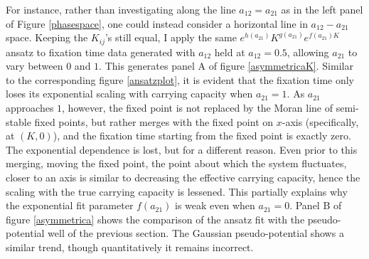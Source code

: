 For instance, rather than investigating along the line $a_{12} = a_{21}$ as in the left panel of Figure \ref{phasespace}, one could instead consider a horizontal line in $a_{12}-a_{21}$ space. 
Keeping the $K_{ij}$'s still equal, I apply the same $e^{h(a_{21})}K^{g(a_{21})}e^{f(a_{21})K}$ ansatz to fixation time data generated with $a_{12}$ held at $a_{12}=0.5$, allowing $a_{21}$ to vary between $0$ and $1$. 
This generates panel A of figure \ref{asymmetricaK}. %
Similar to the corresponding figure \ref{ansatzplot}, it is evident that the fixation time only loses its exponential scaling with carrying capacity when $a_{21}=1$. 
As $a_{21}$ approaches $1$, however, the fixed point is not replaced by the Moran line of semi-stable fixed points, but rather merges with the fixed point on $x$-axis (specifically, at $(K,0)$), and the fixation time starting from the fixed point is exactly zero. 
The exponential dependence is lost, but for a different reason. 
Even prior to this merging, moving the fixed point, the point about which the system fluctuates, closer to an axis is similar to decreasing the effective carrying capacity, hence the scaling with the true carrying capacity is lessened. 
This partially explains why the exponential fit parameter $f(a_{21})$ is weak even when $a_{21}=0$. 
Panel B of figure \ref{asymmetrica} shows the comparison of the ansatz fit with the pseudo-potential well of the previous section. 
The Gaussian pseudo-potential shows a similar trend, though quantitatively it remains incorrect. 
\fi

